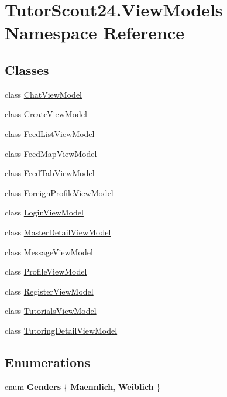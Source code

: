 \hypertarget{namespace_tutor_scout24_1_1_view_models}{}\section{Tutor\+Scout24.\+View\+Models Namespace Reference}
\label{namespace_tutor_scout24_1_1_view_models}
\subsection*{Classes}
\begin{DoxyCompactItemize}
\item 
class \mbox{\hyperlink{class_tutor_scout24_1_1_view_models_1_1_chat_view_model}{Chat\+View\+Model}}
\item 
class \mbox{\hyperlink{class_tutor_scout24_1_1_view_models_1_1_create_view_model}{Create\+View\+Model}}
\item 
class \mbox{\hyperlink{class_tutor_scout24_1_1_view_models_1_1_feed_list_view_model}{Feed\+List\+View\+Model}}
\item 
class \mbox{\hyperlink{class_tutor_scout24_1_1_view_models_1_1_feed_map_view_model}{Feed\+Map\+View\+Model}}
\item 
class \mbox{\hyperlink{class_tutor_scout24_1_1_view_models_1_1_feed_tab_view_model}{Feed\+Tab\+View\+Model}}
\item 
class \mbox{\hyperlink{class_tutor_scout24_1_1_view_models_1_1_foreign_profile_view_model}{Foreign\+Profile\+View\+Model}}
\item 
class \mbox{\hyperlink{class_tutor_scout24_1_1_view_models_1_1_login_view_model}{Login\+View\+Model}}
\item 
class \mbox{\hyperlink{class_tutor_scout24_1_1_view_models_1_1_master_detail_view_model}{Master\+Detail\+View\+Model}}
\item 
class \mbox{\hyperlink{class_tutor_scout24_1_1_view_models_1_1_message_view_model}{Message\+View\+Model}}
\item 
class \mbox{\hyperlink{class_tutor_scout24_1_1_view_models_1_1_profile_view_model}{Profile\+View\+Model}}
\item 
class \mbox{\hyperlink{class_tutor_scout24_1_1_view_models_1_1_register_view_model}{Register\+View\+Model}}
\item 
class \mbox{\hyperlink{class_tutor_scout24_1_1_view_models_1_1_tutorials_view_model}{Tutorials\+View\+Model}}
\item 
class \mbox{\hyperlink{class_tutor_scout24_1_1_view_models_1_1_tutoring_detail_view_model}{Tutoring\+Detail\+View\+Model}}
\end{DoxyCompactItemize}
\subsection*{Enumerations}
\begin{DoxyCompactItemize}
\item 
\mbox{\label{namespace_tutor_scout24_1_1_view_models_a0a646d1c2b52d36c614224dbcc054a36}} 
enum {\bfseries Genders} \{ {\bfseries Maennlich}, 
{\bfseries Weiblich}
 \}
\end{DoxyCompactItemize}
